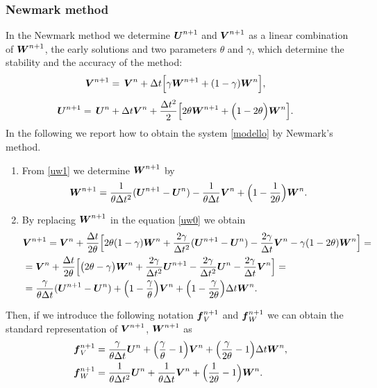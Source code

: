 \documentclass[english,a4paper]{article}
\newcommand{\Ubf}{\text{\mbox{\boldmath $U$}}}
\newcommand{\Abf}{\text{\mbox{\boldmath $W$}}}
\newcommand{\fbf}{\text{\mbox{\boldmath $f$}}}
\newcommand{\Wbf}{\text{\mbox{\boldmath $V$}}}
\begin{document}
\subsubsection{Newmark method}\label{newmark}
In the Newmark method we determine $\Ubf^{n+1}$ and $\Wbf^{n+1}$ as a
linear combination of $\Abf^{n+1}$, the early solutions  and two parameters $\theta$ and
$\gamma$, which determine  the stability and the accuracy of the method:
\begin{eqnarray}\label{uw0}
&\displaystyle\Wbf^{n+1}=\,\Wbf^n+\Delta t\Big[\gamma\Abf^{n+1}+(1-\gamma)\Abf^{n}\Big],
\end{eqnarray}
\begin{eqnarray}\label{uw1}
&\displaystyle\Ubf^{n+1} =\,\Ubf^n+ \Delta t \Wbf^n+\frac{\Delta t^2}{2}\Big[2\theta \Abf^{n+1}+\Big(1-2\theta\Big)\Abf^n\Big].
\end{eqnarray}
In the following we report how to obtain the system   \eqref{modello} by Newmark's  method.
\begin{enumerate}
\item[]From \eqref{uw1} we determine $\Abf^{n+1}$ by
\begin{equation}\label{aa}
\Abf^{n+1}=\frac{1}{\theta \Delta t^2}  (\Ubf^{n+1}-\Ubf^n) - \frac{1}{\theta
  \Delta t}\Wbf^n+\Big(1-\frac{1}{2\theta}\Big)\Abf^n.
\end{equation}
\item[]By replacing $\Abf^{n+1}$ in  the  equation \eqref{uw0} we obtain
\begin{eqnarray}\label{ww}
&\displaystyle\Wbf^{n+1}=\Wbf^n+\frac{\Delta
  t}{2\theta}\Big[2\theta(1-\gamma)\Abf^n+\frac{2\gamma}{\Delta
  t^2}(\Ubf^{n+1}-\Ubf^n)-\frac{2\gamma}{\Delta
  t}\Wbf^n- \gamma(1-2\theta)\Abf^n\Big]= \nonumber\\
&\displaystyle=\Wbf^n+\frac{\Delta
  t}{2\theta}\Big[\big(2\theta-\gamma\big)\Abf^n+\frac{2\gamma}{\Delta
  t^2}\Ubf^{n+1}-\frac{2\gamma}{\Delta t^2}\Ubf^n-\frac{2\gamma}{\Delta t}\Wbf^n\Big]=\nonumber\\
&\displaystyle=\frac{\gamma}{\theta\Delta t}(\Ubf^{n+1}-\Ubf^n)+
\Big(1-\frac{\gamma}{\theta}\Big)\Wbf^n+\Big(1-\frac{\gamma}{2\theta}\Big)\Delta
t\Abf^n.
\end{eqnarray}
\end{enumerate}
Then, if we introduce  the following notation $\fbf_V^{n+1}$ and $\fbf_W^{n+1}$ we
can obtain  the standard representation of $\Wbf^{n+1}$, $\Abf^{n+1}$ as
\begin{eqnarray*}
&\displaystyle\fbf_V^{n+1}=\frac{\gamma}{\theta\Delta t}\Ubf^n+
\Big(\frac{\gamma}{\theta}-1\Big)\Wbf^n+\Big(\frac{\gamma}{2\theta}-1\Big)\Delta
t\Abf^n,\\
& \displaystyle\fbf_W^{n+1}=\frac{1}{\theta \Delta t^2} \Ubf^n + \frac{1}{\theta
  \Delta t}\Wbf^n+\Big(\frac{1}{2\theta}-1\Big)\Abf^n.
\end{eqnarray*}
\end{document}
